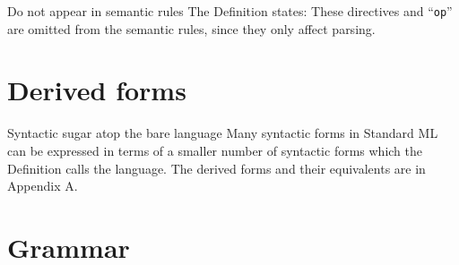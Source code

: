 \begin{clause}{Do not appear in semantic rules}
The Definition states: These directives and ``\texttt{op}'' are omitted
from the semantic rules, since they only affect parsing.
\end{clause}

\section{Derived forms}

\begin{clause}{Syntactic sugar atop the bare language}
Many syntactic forms in Standard ML can be expressed in terms of a
smaller number of syntactic forms which the Definition calls the
 language. The derived forms and their equivalents are in
Appendix A.
\end{clause}

\section{Grammar}

